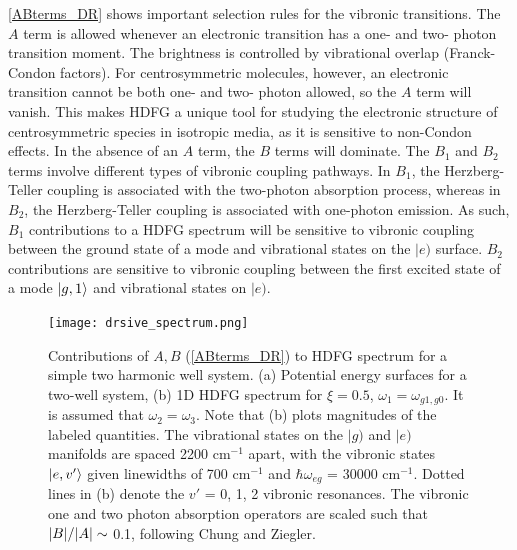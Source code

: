 \documentclass[aip, jcp, reprint, twocolumn]{revtex4-2}
\begin{document}
\autoref{ABterms_DR} shows important selection rules for the vibronic transitions.
The $A$ term is allowed whenever an electronic transition has a one- and two- photon transition moment.
The brightness is controlled by vibrational overlap (Franck-Condon factors).
For centrosymmetric molecules, however, an electronic transition cannot be both one- and two- photon allowed, so the $A$ term will vanish.\cite{Milojevich2013, RN230}
This makes HDFG a unique tool for studying the electronic structure of centrosymmetric species in isotropic media, as it is sensitive to non-Condon effects.\cite{Olson2018}
In the absence of an $A$ term, the $B$ terms will dominate.
The $B_1$ and $B_2$ terms involve different types of vibronic coupling pathways.
In $B_1$, the Herzberg-Teller coupling is associated with the two-photon absorption process, whereas in $B_2$, the Herzberg-Teller coupling is associated with one-photon emission.
As such, $B_1$ contributions to a HDFG spectrum will be sensitive to vibronic coupling between the ground state of a mode and vibrational states on the $|e)$ surface. 
$B_2$ contributions are sensitive to vibronic coupling between the first excited state of a mode $\ket{g,1}$ and vibrational states on $|e)$.

\begin{figure}[!htbp]
	\centering
	\texttt{[image: drsive\_spectrum.png]}
	\caption{Contributions of $A, B$ (\autoref{ABterms_DR}) to HDFG spectrum for a simple two harmonic well system.
		(a) Potential energy surfaces for a two-well system, (b) 1D HDFG spectrum for $\xi = 0.5$, $\omega_1 = \omega_{g1, g0}$. 
		It is assumed that $\omega_2 = \omega_3$.
		Note that (b) plots magnitudes of the labeled quantities.
		The vibrational states on the $|g)$ and $|e)$ manifolds are spaced 2200 cm$^{-1}$ apart, with the vibronic states $\ket{e,v'}$ given linewidths of 700 cm$^{-1}$ and $\hbar \omega_{eg}$ = 30000 cm$^{-1}$.
		Dotted lines in (b) denote the $v'$ = 0, 1, 2 vibronic resonances. 
		The vibronic one and two photon absorption operators are scaled such that $\abs{B}/\abs{A} \sim$ 0.1, following Chung and Ziegler. \cite{Ziegler1988}}
	\label{fig:doubres_spec}
\end{figure}
\end{document}
